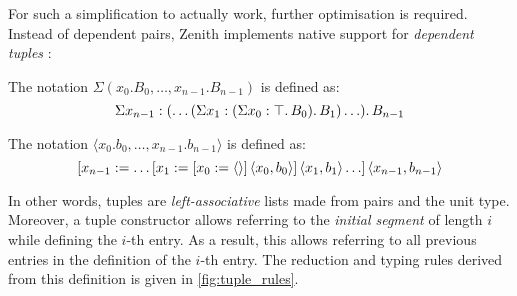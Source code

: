 \documentclass[twoside]{report}
\begin{document}
For such a simplification to actually work, further optimisation is required. Instead of dependent pairs, Zenith implements native support for \emph{dependent tuples} \cite{pollack2000dependently}:

\begin{definition}
\label{def:dependent_tuple_types}
The notation $\Sigma(x_0. B_0, \ldots, x_{n-1}. B_{n-1})$ is defined as: $$\Sigma{x_{n-1}} : {(\ldots (\Sigma{x_1} : {(\Sigma{x_0} : {\top}.\,{B_0})}.\,{B_1}) \ldots)}.\,{B_{n-1}}$$
\end{definition}

\begin{definition}
\label{def:dependent_tuple_constructors}
The notation $\langle x_0. b_0, \ldots, x_{n-1}. b_{n-1}\rangle$ is defined as: $$[{x_{n-1}}:={\ldots [{x_1}:={[{x_0}:={\langle\rangle}]\,{\langle{x_0}, {b_0}\rangle}}]\,{\langle{x_1}, {b_1}\rangle} \ldots}]\,{\langle{x_{n-1}}, {b_{n-1}}\rangle}$$
\end{definition}

In other words, tuples are \emph{left-associative} lists made from pairs and the unit type. Moreover, a tuple constructor allows referring to the \emph{initial segment} of length $i$ while defining the $i$-th entry. As a result, this allows referring to all previous entries in the definition of the $i$-th entry. The reduction and typing rules derived from this definition is given in \cref{fig:tuple_rules}.
\end{document}
